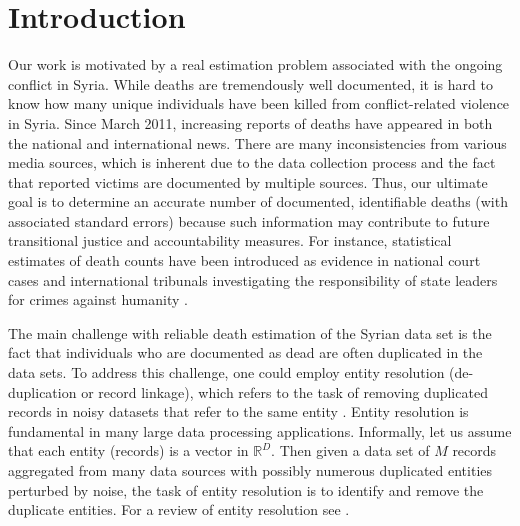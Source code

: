 \documentclass{imsart}
\begin{document}
\begin{frontmatter}
\begin{keyword}
\end{keyword}

\end{frontmatter}

\section{Introduction}
\label{sec:intro}

Our work is motivated by a real estimation problem associated with the ongoing conflict in Syria. While deaths are tremendously well documented, it is hard to know how many unique individuals have been killed from conflict-related violence in Syria. Since March 2011, increasing reports of deaths have appeared in both the national and international news. There are many inconsistencies from various media sources, which is inherent due to the data collection process and the fact that reported victims are documented by multiple sources. Thus, our ultimate goal is to determine an accurate number of documented,  identifiable deaths (with associated standard errors) because such information may contribute to future transitional justice and accountability measures. For instance, statistical estimates of death counts have been introduced as evidence in national court cases and international tribunals investigating the responsibility of state leaders for crimes against humanity \citep{hrdag-2017}.


The main challenge with reliable death estimation of the Syrian data set is the fact that individuals who are documented as dead are often duplicated in the data sets. To address this challenge, one could employ entity resolution (de-duplication or record linkage), which refers to the task of removing duplicated records in noisy datasets that refer to the same entity  \citep{liseo_2011, sadinle_2014, getoor_2006, gutman_2013,  McCallumWellner04, fellegi_1969}. Entity resolution is fundamental in many large data processing applications. Informally, let us assume that each entity (records) is a vector in $\mathbb{R}^D$. Then given a data set of $M$ records aggregated from many data sources with possibly numerous duplicated entities perturbed by noise, the task of entity resolution is to identify and remove the duplicate entities. For a review of entity resolution see \citep{winkler_2006, christen_2012, liseo2013some}.
\end{document}
